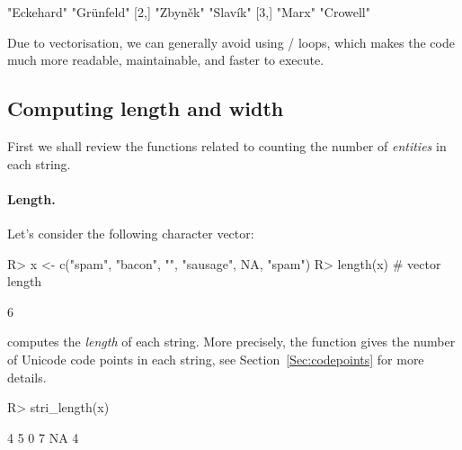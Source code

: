 \documentclass[nojss]{jss}
\begin{document}
\begin{Schunk}
\begin{Soutput}
     [,1]       [,2]
[1,] "Eckehard" "Grünfeld"
[2,] "Zbyněk"   "Slavík"
[3,] "Marx"     "Crowell"
\end{Soutput}
\end{Schunk}

\noindent
Due to {vectorisation}, we can generally
avoid using / loops,
which makes the code much more readable, maintainable, and faster to execute.





\subsection{Computing length and width}


First we shall review the functions related to counting
the number of \textit{entities} in each string.



\paragraph{Length.}
Let's consider the following character vector:

\begin{Schunk}
\begin{Sinput}
R> x <- c("spam", "bacon", "", "sausage", NA, "spam")
R> length(x)        # vector length
\end{Sinput}
\begin{Soutput}
[1] 6
\end{Soutput}
\end{Schunk}


 computes the \textit{length}
of each string.
More precisely,
the function gives the number of Unicode code points in each string,
see Section~\ref{Sec:codepoints} for more details.

\begin{Schunk}
\begin{Sinput}
R> stri_length(x)
\end{Sinput}
\begin{Soutput}
[1]  4  5  0  7 NA  4
\end{Soutput}
\end{Schunk}
\end{document}
